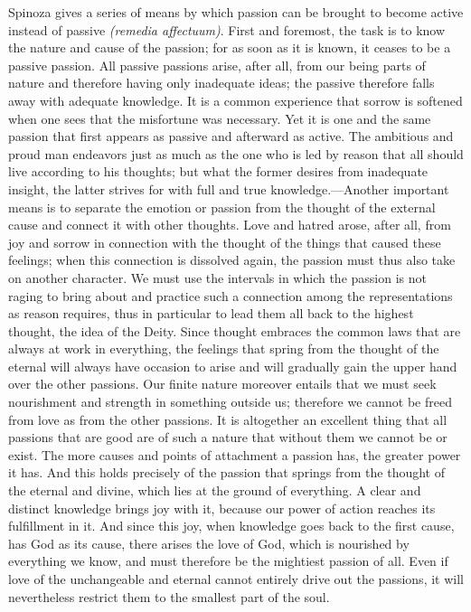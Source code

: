\documentclass[12pt]{book}
\newcommand{\opage}[1]{\marginnote{\footnotesize\textit{[#1]}}}
\begin{document}
Spinoza gives a series of means by which passion can be brought to become active
instead of passive \textit{(remedia affectuum)}. First and foremost, the task is to know
the nature and cause of the passion; for as soon as it is known, it ceases to be a
passive passion. All passive passions arise, after all, from our being parts of nature
and therefore having only inadequate ideas; the passive therefore falls away with
adequate knowledge. It is a common experience that sorrow \opage{139}is softened when one
sees that the misfortune was necessary. Yet it is one and the same passion that first
appears as passive and afterward as active. The ambitious and proud man endeavors just as
much as the one who is led by reason that all should live according to his thoughts; but
what the former desires from inadequate insight, the latter strives for with full and true
knowledge.---Another important means is to separate the emotion or passion from the
thought of the external cause and connect it with other thoughts. Love and hatred arose,
after all, from joy and sorrow in connection with the thought of the things that caused
these feelings; when this connection is dissolved again, the passion must thus also take
on another character. We must use the intervals in which the passion is not raging to
bring about and practice such a connection among the representations as reason requires,
thus in particular to lead them all back to the highest thought, the idea of the Deity.
Since thought embraces the common laws that are always at work in everything, the
feelings that spring from the thought of the eternal will always have occasion to arise
and will gradually gain the upper hand over the other passions. Our finite nature
moreover entails that we must seek nourishment and strength in something outside us;
therefore we cannot be freed from love as from the other passions. It is altogether an
excellent thing that all passions that are good are of such a nature that without them
we cannot be or exist. The more causes and points of attachment a passion has, the
greater power it has. And this holds precisely of the passion that springs from
\opage{140}the thought of the eternal and divine, which lies at the ground of everything.
A clear and distinct knowledge brings joy with it, because our power of action reaches
its fulfillment in it. And since this joy, when knowledge goes back to the first cause,
has God as its cause, there arises the love of God, which is nourished by everything we
know, and must therefore be the mightiest passion of all. Even if love of the
unchangeable and eternal cannot entirely drive out the passions, it will nevertheless
restrict them to the smallest part of the soul.
\end{document}
